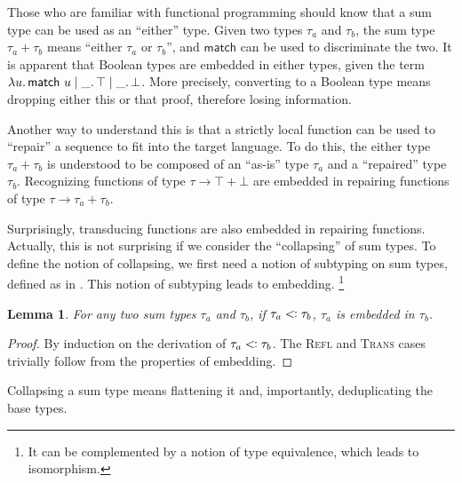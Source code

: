 \documentclass[11pt]{article}
\theoremstyle{definition}
\theoremstyle{plain}
\newtheorem{lemma}{Lemma}
\newcommand{\hole}{\_}
\newcommand{\subt}{\mathrel{<\mkern-1.2mu\vcentcolon}}
\begin{document}
Those who are familiar with functional programming should know that a
sum type can be used as an \enquote{either} type.  Given two types
\(\tau_{a}\) and \(\tau_{b}\), the sum type \(\tau_{a} + \tau_{b}\)
means \enquote{either \(\tau_{a}\) or \(\tau_{b}\)}, and
\(\mathsf{match}\) can be used to discriminate the two.  It is
apparent that Boolean types are embedded in either types, given the
term \(\lambda u\ldotp \mathsf{match}\ u
         \mid \hole\ldotp \top
         \mid \hole\ldotp \bot\).
More precisely, converting to a Boolean type means dropping either
this or that proof, therefore losing information.

Another way to understand this is that a strictly local function can
be used to \enquote{repair} a sequence to fit into the target
language.  To do this, the either type \(\tau_{a} + \tau_{b}\) is
understood to be composed of an \enquote{as-is} type \(\tau_{a}\) and
a \enquote{repaired} type \(\tau_{b}\).  Recognizing functions of type
\(\tau \to \top + \bot\) are embedded in repairing functions of type
\(\tau \to \tau_{a} + \tau_{b}\).

Surprisingly, transducing functions are also embedded in repairing
functions.  Actually, this is not surprising if we consider the
\enquote{collapsing} of sum types.  To define the notion of
collapsing, we first need a notion of subtyping on sum types, defined
as in .  This notion of subtyping leads to
embedding.%
\footnote{It can be complemented by a notion of type equivalence,
  which leads to isomorphism.}

\begin{lemma}
  For any two sum types \(\tau_{a}\) and \(\tau_{b}\), if
  \(\tau_{a} \subt \tau_{b}\), \(\tau_{a}\) is embedded in
  \(\tau_{b}\).
  \label{lem:sub-emb}
\end{lemma}

\begin{proof}
  By induction on the derivation of \(\tau_{a} \subt \tau_{b}\).  The
  \textsc{Refl} and \textsc{Trans} cases trivially follow from the
  properties of embedding.
\end{proof}

Collapsing a sum type means flattening it and, importantly,
deduplicating the base types.
\end{document}
